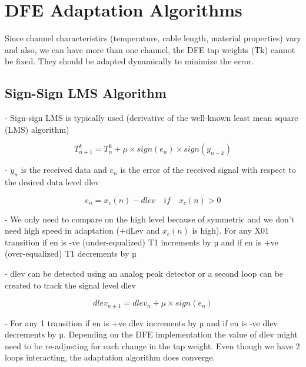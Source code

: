 \section{DFE Adaptation Algorithms}

Since channel characteristics (temperature, cable length, material properties) vary and also, we can have more than one channel, the DFE tap weights (Tk) cannot be fixed. They should be adapted dynamically to minimize the error.

\subsection{Sign-Sign LMS Algorithm}
- Sign-sign LMS is typically used (derivative of the well-known least mean square (LMS) algorithm)

\begin{equation*}
    T_{n+1}^{k} = T_{n}^{k} + \mu \times sign(e_n) \times sign(y_{n-k})
\end{equation*}

- $y_n$ is the received data and $e_n$ is the error of the received signal with respect to the desired data level dlev

\begin{equation*}
    e_n = x_c(n) - dlev \quad if \quad x_c(n) > 0
\end{equation*}

- We only need to compare on the high level because of symmetric and we don't need high speed in adaptation (+dLev and $x_c(n)$ is high). For any X01 transition if en is -ve (under-equalized) T1 increments by µ and if en is +ve (over-equalized) T1 decrements by µ

- dlev can be detected using an analog peak detector or a second loop can be created to track the signal level dlev

\begin{equation*}
    dlev_{n+1} = dlev_n + \mu \times sign(e_n)
\end{equation*}

- For any 1 transition if en is +ve dlev increments by µ and if en is -ve dlev decrements by µ. Depending on the DFE implementation the value of dlev might need to be re-adjusting for each change in the tap weight. Even though we have 2 loops interacting, the adaptation algorithm does converge.